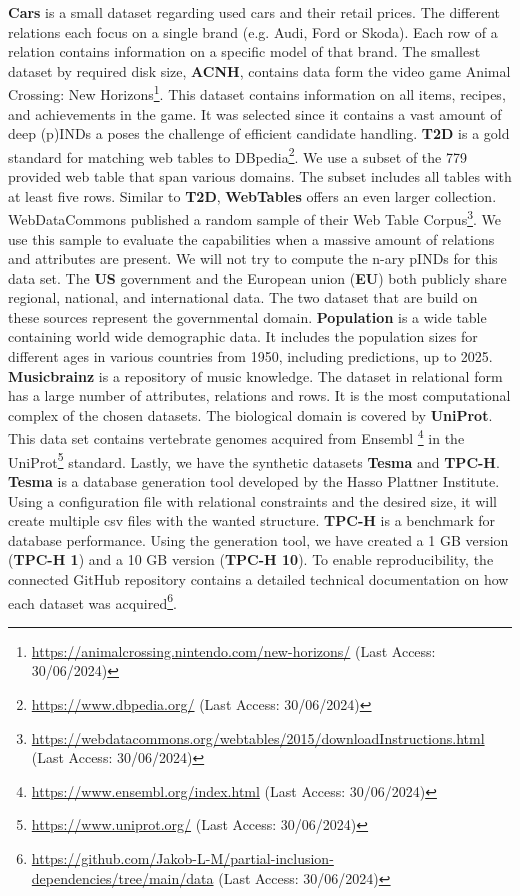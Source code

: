 \textbf{Cars} is a small dataset regarding used cars and their retail prices. The different relations each focus on a single brand (e.g. Audi, Ford or Skoda). Each row of a relation contains information on a specific model of that brand. The smallest dataset by required disk size, \textbf{ACNH}, contains data form the video game Animal Crossing: New Horizons\footnote{\url{https://animalcrossing.nintendo.com/new-horizons/} (Last Access: 30/06/2024)}. This dataset contains information on all items, recipes, and achievements in the game. It was selected since it contains a vast amount of deep (p)INDs a poses the challenge of efficient candidate handling. \textbf{T2D} is a gold standard for matching web tables to DBpedia\footnote{\url{https://www.dbpedia.org/} (Last Access: 30/06/2024)}. We use a subset of the 779 provided web table that span various domains. The subset includes all tables with at least five rows. Similar to \textbf{T2D}, \textbf{WebTables} offers an even larger collection. WebDataCommons published a random sample of their Web Table Corpus\footnote{\url{https://webdatacommons.org/webtables/2015/downloadInstructions.html} (Last Access: 30/06/2024)}. We use this sample to evaluate the capabilities when a massive amount of relations and attributes are present. We will not try to compute the n-ary pINDs for this data set. The \textbf{US} government and the European union (\textbf{EU}) both publicly share regional, national, and international data. The two dataset that are build on these sources represent the governmental domain. \textbf{Population} is a wide table containing world wide demographic data. It includes the population sizes for different ages in various countries from 1950, including predictions, up to 2025. \textbf{Musicbrainz} is a repository of music knowledge. The dataset in relational form has a large number of attributes, relations and rows. It is the most computational complex of the chosen datasets. The biological domain is covered by \textbf{UniProt}. This data set contains vertebrate genomes acquired from Ensembl \footnote{\url{https://www.ensembl.org/index.html} (Last Access: 30/06/2024)} in the UniProt\footnote{\url{https://www.uniprot.org/} (Last Access: 30/06/2024)} standard. Lastly, we have the synthetic datasets \textbf{Tesma} and \textbf{TPC-H}. \textbf{Tesma} is a database generation tool developed by the Hasso Plattner Institute. Using a configuration file with relational constraints and the desired size, it will create multiple csv files with the wanted structure. \textbf{TPC-H} is a benchmark for database performance. Using the generation tool, we have created a 1 GB version (\textbf{TPC-H 1}) and a 10 GB version (\textbf{TPC-H 10}). To enable reproducibility, the connected GitHub repository contains a detailed technical documentation on how each dataset was acquired\footnote{\url{https://github.com/Jakob-L-M/partial-inclusion-dependencies/tree/main/data} (Last Access: 30/06/2024)}.

